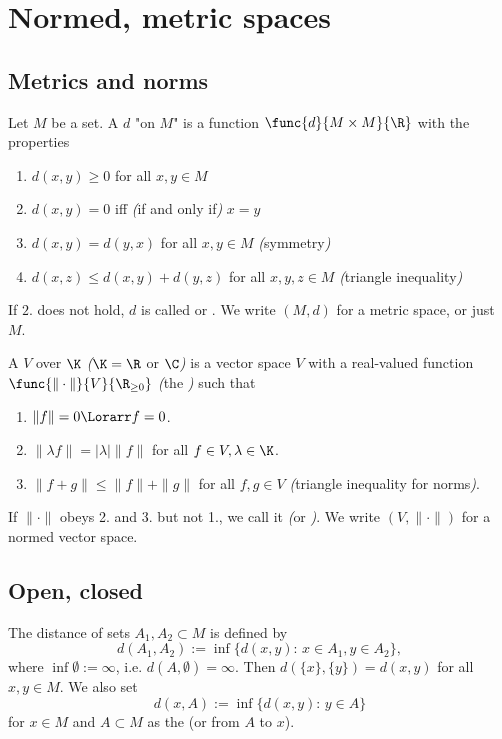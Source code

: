 \section{Normed, metric spaces}

\subsection{Metrics and norms}

\begin{definition}[Metric]
Let $M$ be a set. A  $d$ "on $M$" is a function $\func{d}{M\times M}{\R}$ with the properties
\begin{enumerate}
\item $d(x,y)\geq0$ for all $x,y\in M$
\item $d(x,y)=0$ iff \emph{(}if and only if\emph{)} $x=y$
\item $d(x,y)=d(y,x)$ for all $x,y\in M$ \emph{(}symmetry\emph{)}
\item $d(x,z)\leq d(x,y)+d(y,z)$ for all $x,y,z\in M$ \emph{(}triangle inequality\emph{)}
\end{enumerate}
If $2.$ does not hold, $d$ is called  or . 
We write $(M,d)$ for a metric space, or just $M$.
\end{definition}

\begin{definition}
A  $V$ over $\K$ \emph{(}$\K=\R$ or $\C$\emph{)} is a vector space $V$ 
with a real-valued function $\func{\|\cdot\|}{V}{\R_{\geq0}}$ \emph{(}the \emph{)} such that
\begin{enumerate}
    \item $\|f\|=0\Lorarr f=0$.
    \item $\|\lambda f\|=|\lambda|\|f\|$ for all $f\in V,\lambda\in\K$.
    \item $\|f+g\|\leq\|f\|+\|g\|$ for all $f,g\in V$ \emph{(}triangle inequality for norms\emph{)}.
\end{enumerate}
If $\|\cdot\|$ obeys 2. and 3. but not 1., we call it  \emph{(}or \emph{)}. 
We write $(V,\|\cdot\|)$ for a normed vector space.
\end{definition}

\subsection{Open, closed}

\begin{definition*}
The distance of sets \(A_1, A_2 \subset M\) is defined by 
\[d(A_1,A_2):=\inf\{d(x,y):\,x\in A_1,y\in A_2\},\]
where $\inf\emptyset:=\infty$, i.e. $d(A,\emptyset)=\infty$. Then $d(\{x\},\{y\})=d(x,y)$ for all $x,y\in M$. We also set
\[d(x,A):=\inf\{d(x,y):\,y\in A\}\]
for $x\in M$ and $A\subset M$ as the  (or from $A$ to $x$).
\end{definition*}

